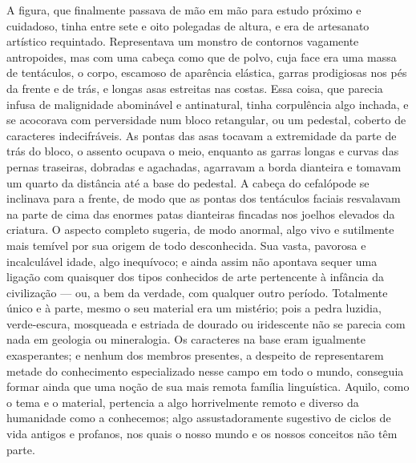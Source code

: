 A figura, que finalmente passava de mão em mão para estudo próximo e
cuidadoso, tinha entre sete e oito polegadas de altura, e era de
artesanato artístico requintado. Representava um monstro de contornos
vagamente antropoides, mas com uma cabeça como que de polvo, cuja face
era uma massa de tentáculos, o corpo, escamoso de aparência elástica,
garras prodigiosas nos pés da frente e de trás, e longas asas estreitas
nas costas. Essa coisa, que parecia infusa de malignidade abominável e
antinatural, tinha corpulência algo inchada, e se acocorava com
perversidade num bloco retangular, ou um pedestal, coberto de caracteres
indecifráveis. As pontas das asas tocavam a extremidade da parte de trás
do bloco, o assento ocupava o meio, enquanto as garras longas e curvas
das pernas traseiras, dobradas e agachadas, agarravam a borda dianteira
e tomavam um quarto da distância até a base do pedestal. A cabeça do
cefalópode se inclinava para a frente, de modo que as pontas dos
tentáculos faciais resvalavam na parte de cima das enormes patas
dianteiras fincadas nos joelhos elevados da criatura. O aspecto completo
sugeria, de modo anormal, algo vivo e sutilmente mais temível por sua
origem de todo desconhecida. Sua vasta, pavorosa e incalculável idade,
algo inequívoco; e ainda assim não apontava sequer uma ligação com
quaisquer dos tipos conhecidos de arte pertencente à infância da
civilização --- ou, a bem da verdade, com qualquer outro período.
Totalmente único e à parte, mesmo o seu material era um mistério; pois a
pedra luzidia, verde-escura, mosqueada e estriada de dourado ou
iridescente não se parecia com nada em geologia ou mineralogia. Os
caracteres na base eram igualmente exasperantes; e nenhum dos membros
presentes, a despeito de representarem metade do conhecimento
especializado nesse campo em todo o mundo, conseguia formar ainda que
uma noção de sua mais remota família linguística. Aquilo, como o tema e
o material, pertencia a algo horrivelmente remoto e diverso da
humanidade como a conhecemos; algo assustadoramente sugestivo de ciclos
de vida antigos e profanos, nos quais o nosso mundo e os nossos
conceitos não têm parte.

